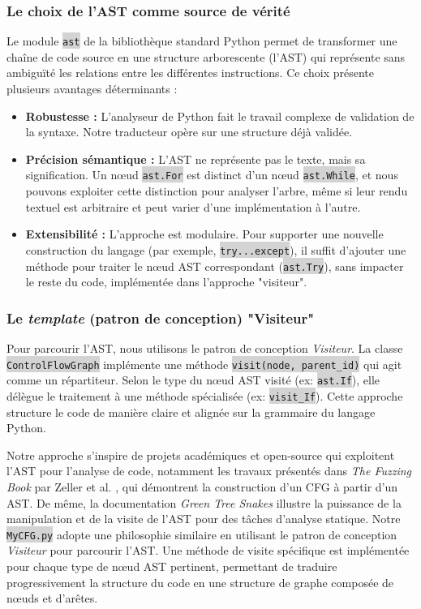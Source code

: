 \documentclass[11pt,a4paper]{article}
\newcommand{\code}[1]{\colorbox{lightgray}{\texttt{\small #1}}}
\begin{document}
\subsubsection{Le choix de l'AST comme source de vérité}
Le module \code{ast} de la bibliothèque standard Python permet de transformer une chaîne de code source en une structure arborescente (l'AST) qui représente sans ambiguïté les relations entre les différentes instructions. Ce choix présente plusieurs avantages déterminants :
\begin{itemize}
    \item \textbf{Robustesse :} L'analyseur de Python fait le travail complexe de validation de la syntaxe. Notre traducteur opère sur une structure déjà validée.
    \item \textbf{Précision sémantique :} L'AST ne représente pas le texte, mais sa signification. Un nœud \code{ast.For} est distinct d'un nœud \code{ast.While}, et nous pouvons exploiter cette distinction pour analyser l'arbre, même si leur rendu textuel est arbitraire et peut varier d'une implémentation à l'autre.  
    \item \textbf{Extensibilité :} L'approche est modulaire. Pour supporter une nouvelle construction du langage (par exemple, \code{try...except}), il suffit d'ajouter une méthode pour traiter le nœud AST correspondant (\code{ast.Try}), sans impacter le reste du code, implémentée dans l'approche "visiteur".
\end{itemize}

\subsubsection{Le \textit{template} (patron de conception) "Visiteur"}
Pour parcourir l'AST, nous utilisons le patron de conception \textit{Visiteur}. La classe \code{ControlFlowGraph} implémente une méthode \code{visit(node, parent\_id)} qui agit comme un répartiteur. Selon le type du nœud AST visité (ex: \code{ast.If}), elle délègue le traitement à une méthode spécialisée (ex: \code{visit\_If}). Cette approche structure le code de manière claire et alignée sur la grammaire du langage Python.

Notre approche s'inspire de projets académiques et open-source qui exploitent l'AST pour l'analyse de code, notamment les travaux présentés dans \textit{The Fuzzing Book} par Zeller et al. \cite{fuzzingbook}, qui démontrent la construction d'un CFG à partir d'un AST. De même, la documentation \textit{Green Tree Snakes} \cite{greentreesnakes} illustre la puissance de la manipulation et de la visite de l'AST pour des tâches d'analyse statique. Notre \code{MyCFG.py} adopte une philosophie similaire en utilisant le patron de conception \textit{Visiteur} pour parcourir l'AST. Une méthode de visite spécifique est implémentée pour chaque type de nœud AST pertinent, permettant de traduire progressivement la structure du code en une structure de graphe composée de nœuds et d'arêtes.
\clearpage
\end{document}
